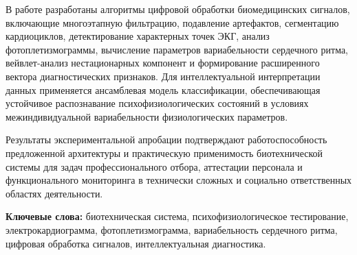 В работе разработаны алгоритмы цифровой обработки биомедицинских
сигналов, включающие многоэтапную фильтрацию, подавление артефактов,
сегментацию кардиоциклов, детектирование характерных точек ЭКГ, анализ
фотоплетизмограммы, вычисление параметров вариабельности сердечного
ритма, вейвлет-анализ нестационарных компонент и формирование
расширенного вектора диагностических признаков. Для интеллектуальной
интерпретации данных применяется ансамблевая модель классификации,
обеспечивающая устойчивое распознавание психофизиологических состояний в
условиях межиндивидуальной вариабельности физиологических параметров.

Результаты экспериментальной апробации подтверждают работоспособность
предложенной архитектуры и практическую применимость биотехнической
системы для задач профессионального отбора, аттестации персонала и
функционального мониторинга в технически сложных и социально
ответственных областях деятельности.

{\bfseries Ключевые слова:} биотехническая система, психофизиологическое
тестирование, электрокардиограмма, фотоплетизмограмма, вариабельность
сердечного ритма, цифровая обработка сигналов, интеллектуальная
диагностика.

